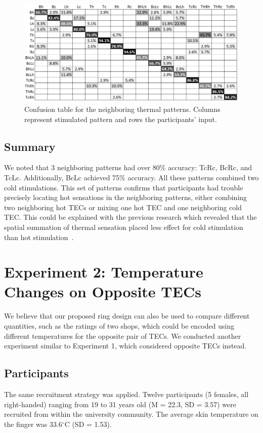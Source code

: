\documentclass[preprint,12pt]{elsarticle}
\begin{document}
\begin{figure}[tp]
  \centering
  \includegraphics[width=0.9\columnwidth]{img/fig11.png}
  \caption{Confusion table for the neighboring thermal patterns. Columns represent stimulated pattern and rows the participants' input.}
  \label{fig:11}
\end{figure}

\subsection{Summary}
We noted that 3 neighboring patterns had over 80\% accuracy: TcRc, BcRc, and TcLc. Additionally, BcLc achieved 75\% accuracy. All these patterns combined two cold stimulations. This set of patterns confirms that participants had trouble precisely locating hot sensations in the neighboring patterns, either combining two neighboring hot TECs or mixing one hot TEC and one neighboring cold TEC. This could be explained with the previous research which revealed that the spatial summation of thermal sensation placed less effect for cold stimulation than hot stimulation~\cite{43}.

\section{Experiment 2: Temperature Changes on Opposite TECs}
We believe that our proposed ring design can also be used to compare different quantities, such as the ratings of two shops, which could be encoded using different temperatures for the opposite pair of TECs. We conducted another experiment similar to Experiment 1, which considered opposite TECs instead.

\subsection{Participants}
The same recruitment strategy was applied. Twelve participants (5 females, all right-handed) ranging from 19 to 31 years old (M = 22.3, SD = 3.57) were recruited from within the university community. The average skin temperature on the finger was 33.6$^{\circ}$C (SD = 1.53).
\end{document}
